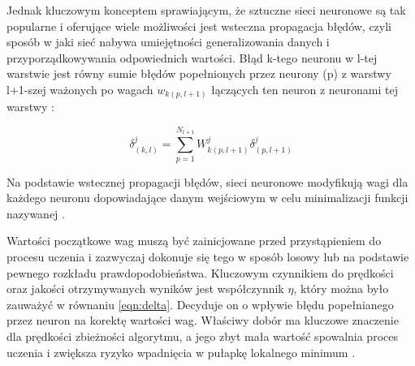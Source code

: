 Jednak kluczowym konceptem sprawiającym, że sztuczne sieci neuronowe są tak popularne i oferujące wiele możliwości jest wsteczna propagacja błędów, czyli sposób w jaki sieć nabywa umiejętności generalizowania danych i przyporządkowywania odpowiednich wartości. Błąd k-tego neuronu w l-tej warstwie jest równy sumie błędów popełnionych przez neurony (p) z warstwy l+1-szej ważonych po wagach $w_{k(p,l+1)}$ łączących ten neuron z neuronami tej warstwy \cite{Prezentacja:SNN}: 

\[
\delta_{(k,l)}^{j} = \sum_{p=1}^{N_{l+1}} W^{j}_{k(p, l+1)} \delta_{(p,l+1)}^{j}
\]

Na podstawie wstecznej propagacji błędów, sieci neuronowe modyfikują wagi dla każdego neuronu dopowiadające danym wejściowym w celu minimalizacji funkcji nazywanej .

Wartości początkowe wag muszą być zainicjowane przed przystąpieniem do procesu uczenia i zazwyczaj dokonuje się tego w sposób losowy lub na podstawie pewnego rozkładu prawdopodobieństwa. Kluczowym czynnikiem do prędkości oraz jakości otrzymywanych wyników jest współczynnik $\eta$, który można było zauważyć w równaniu \ref{eqn:delta}. Decyduje on o wpływie błędu popełnianego przez neuron na korektę wartości wag. Właściwy dobór ma kluczowe znaczenie dla prędkości zbieżności algorytmu, a jego zbyt mała wartość spowalnia proces uczenia i zwiększa ryzyko
wpadnięcia w pułapkę lokalnego minimum \cite{Prezentacja:SNN}. 

